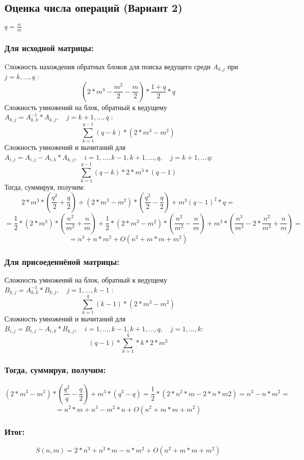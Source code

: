 \documentclass[a4paper,12pt]{article}
\begin{document}
\subsection{Оценка числа операций (Вариант 2)}
$q = \frac{n}{m}$\\
\subsubsection{Для исходной матрицы:}
Cложность нахождения обратных блоков для поиска ведущего среди $A_{k,j}$ при $j = k,...,q$ :\\
$$(2*m^{3} - \frac{m^{2}}{2} - \frac{m}{2}) * \frac{1 + q}{2} * q$$ 
Сложность умножений на блок, обратный к ведущему $A_{k, j} = A_{k, k}^{-1} * A_{k, j},
\quad j = k + 1,...,q$ :\\
$$\sum\limits_{k=1}^{q-1}(q - k)*(2*m^{3}-m^{2})$$
Сложность умножений и вычитаний для 
$A_{i, j} = A_{i, j} - A_{i, k} * A_{k, j}, \quad i = 1,...,k-1,k+1,...,q,
\quad j = k + 1,..,q$:\\
$$\sum\limits_{k=1}^{q-1}(q-k)*2*m^{3}*(q-1)$$
Тогда, суммируя, получим: 
$$ 2*m^{3}*(\frac{q^{2}}{2} + \frac{q}{2}) + (2*m^{3}-m^{2})*(\frac{q^{2}}{2} - \frac{q}{2})
+ m^{3}(q - 1)^{2}*q = $$
$$=\frac{1}{2} * (2*m^{3}) * (\frac{n^{2}}{m^{2}} + \frac{n}{m}) + \frac{1}{2} * (2*m^{3} - m^{2})
*(\frac{n^{2}}{m^{2}} - \frac{n}{m}) + m^{3}*(\frac{n^{3}}{m^{3}} - 2*\frac{n^{2}}{m^{2}} +
\frac{n}{m}) = $$
$$ = n^{3} + n*m^{2} + O(n^{2} + m*m + m^{2})$$
\subsubsection{Для присоеденнёной матрицы:}
Сложность умножений на блок, обратный к ведущему $B_{k, j} = A_{k, k}^{-1} * B_{k, j},
\quad j = 1,...,k-1$ :\\
$$\sum\limits_{k=1}^{q}(k-1)*(2*m^{3} - m^{2})$$
Сложность умножений и вычитаний для 
$B_{i, j} = B_{i, j} - A_{i, k} * B_{k, j}, \quad i = 1,...,k-1,k+1,...,q,
\quad j = 1,...,k$:\\
$$(q-1)*\sum\limits_{k=1}^{q}*k*2*m^{3}$$
\subsubsection{Тогда, суммируя, получим:}
$$(2*m^{3} - m^{2})*(\frac{q^{2}}{q} - \frac{q}{2}) + m^{3}*(q^{3} - q) = 
\frac{1}{2}*(2*n^{2}*m - 2*n*m{2}) = n^{3} - n*m^{2} = $$
$$ = n^{2}*m + n^{3} - m^{2} * n + O(n^{2} + m*m + m^{2})$$
\subsubsection{Итог:}
$$S(n, m) = 2*n^{3} + n^{2}*m - n*m^{2} + O(n^{2} + m*m + m^{2})$$
\end{document}
